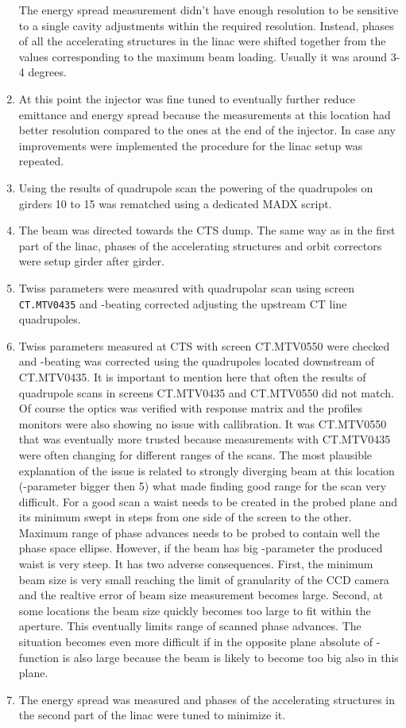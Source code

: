 \begin{enumerate}
The energy spread measurement didn't have enough resolution
to be sensitive to a single cavity adjustments within the required resolution.
Instead, phases of all the accelerating structures in the linac were shifted together 
from the values corresponding to the maximum beam loading.
Usually it was around 3-4 degrees.
\item
At this point the injector was fine tuned to eventually further reduce emittance and energy spread
because the measurements at this location had better resolution compared to the ones at the end of the injector.
In case any improvements were implemented the procedure for the linac setup was repeated.
\item
Using the results of quadrupole scan the powering of the quadrupoles on girders 10 to 15 
was rematched using a dedicated MADX script. 
\item
The beam was directed towards the CTS dump. The same way as in the first part of the linac,
phases of the accelerating structures and orbit correctors were setup girder after girder.
\item
Twiss parameters were measured with quadrupolar scan using screen \texttt{CT.MTV0435}
and \textbeta-beating corrected adjusting the upstream CT line quadrupoles.
\item
Twiss parameters measured at CTS with screen CT.MTV0550 were checked
and \textbeta-beating was corrected using the quadrupoles located downstream of CT.MTV0435.
It is important to mention here that often the results of quadrupole scans in screens
CT.MTV0435 and CT.MTV0550 did not match. 
Of course the optics was verified with response matrix and 
the profiles monitors were also showing no issue with callibration.
It was CT.MTV0550 that was eventually more trusted because
measurements with CT.MTV0435 were often changing for different ranges of the scans.
The most plausible explanation of the issue is related to strongly diverging beam at this location
(\textalpha-parameter bigger then 5) what made finding good range for the scan very difficult.
For a good scan a waist needs to be created in the probed plane and its minimum 
swept in steps from one side of the screen to the other.
Maximum range of phase advances needs to be probed to contain well the phase space ellipse.
However, if the beam has big \textalpha-parameter the produced waist is very steep.
It has two adverse consequences. 
First, the minimum beam size is very small reaching the limit of granularity of the CCD camera
and the realtive error of beam size measurement becomes large.
Second, at some locations the beam size quickly becomes too large to fit within the aperture.
This eventually limits range of scanned phase advances.
The situation becomes even more difficult if in the opposite plane absolute of \textalpha-function
is also large because the beam is likely to become too big also in this plane.
\item
The energy spread was measured and phases of the accelerating structures 
in the second part of the linac were tuned to minimize it.
\end{enumerate}
